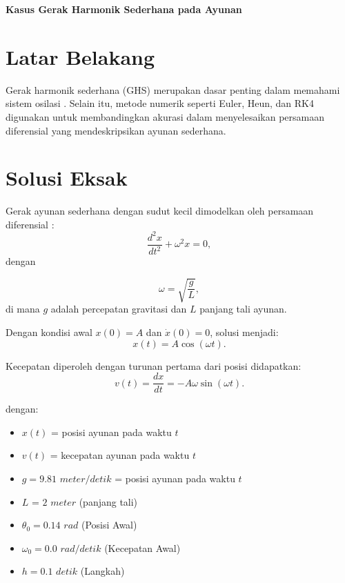 \documentclass[12pt,a4paper,onecolumn]{report}
\begin{document}
\noindent
\large \textbf{Kasus Gerak Harmonik Sederhana pada Ayunan} \\
\noindent
{}

\vspace{2em}

\noindent
\section{Latar Belakang} 
Gerak harmonik sederhana (GHS) merupakan dasar penting dalam memahami sistem osilasi \cite{getaranmekanik2020}. 
Selain itu, metode numerik seperti Euler, Heun, dan RK4 digunakan untuk membandingkan akurasi 
dalam menyelesaikan persamaan diferensial yang mendeskripsikan ayunan sederhana. 

\vspace{1.2em}

\section{Solusi Eksak}
Gerak ayunan sederhana dengan sudut kecil dimodelkan oleh persamaan diferensial \cite{getaranmekanik2020}:
$$\frac{d^2x}{dt^2} + \omega^2 x = 0,$$
dengan 

$$\omega = \sqrt{\frac{g}{L}},$$
di mana $g$ adalah percepatan gravitasi dan $L$ panjang tali ayunan.

\vspace{1em}
\noindent
Dengan kondisi awal $x(0) = A$ dan $\dot{x}(0) = 0$, solusi menjadi:
\begin{equation}
x(t) = A \cos(\omega t).
\end{equation}

\noindent
Kecepatan diperoleh \cite{euler_method} dengan turunan pertama dari posisi didapatkan:
\begin{equation}
v(t) = \frac{dx}{dt} = -A \omega \sin(\omega t).
\end{equation}

\newpage
\noindent
dengan:

\begin{itemize}
    \item $x (t)$ = posisi ayunan pada waktu $t$
    \item $v (t)$ = kecepatan ayunan pada waktu $t$
    \item $g = 9.81$ $meter/detik$ = posisi ayunan pada waktu $t$
    \item $L$ = $2$ $meter$ (panjang tali)
    \item $\theta_0 = 0.14$ $rad$ (Posisi Awal)
    \item $\omega_0 = 0.0$ $rad/detik$ (Kecepatan Awal)
    \item $h = 0.1$ $detik$ (Langkah)
\end{itemize}

\vspace{2em}


\noindent




\end{document}
